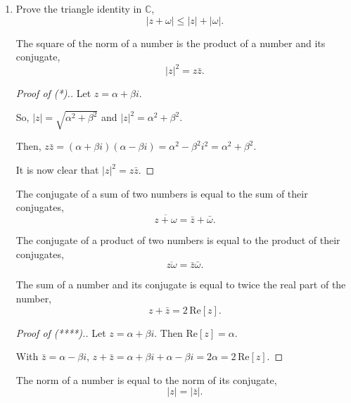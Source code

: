 \documentclass[../hw4]{subfiles}
\begin{document}
\begin{enumerate}[label= (\alph*)]
    \item Prove the triangle identity in $\mathbb{C}$, \[|z+\omega|\leq|z|+|\omega|.\]
    
    \begin{proposition}[*]
        The square of the norm of a number is the product of a number and its conjugate, \[{|z|}^2=z\bar{z}.\]
    \end{proposition}

    \begin{proof}[Proof of (*).]
        Let $z=\alpha + \beta i$.

        So, $|z|=\sqrt{\alpha^2+\beta^2}$ and ${|z|}^2=\alpha^2+\beta^2$.

        Then, $z\bar{z}=(\alpha+\beta i)(\alpha - \beta i)=\alpha^2-\beta^2 i^2 = \alpha^2 + \beta^2$.

        It is now clear that ${|z|}^2=z\bar{z}$.
    \end{proof}

    \begin{proposition}[**]
        The conjugate of a sum of two numbers is equal to the sum of their conjugates, \[\overline{z+\omega}=\bar{z}+\bar{\omega}.\]
    \end{proposition}

    \begin{proposition}[***]
        The conjugate of a product of two numbers is equal to the product of their conjugates, \[\overline{z\omega}=\bar{z}\bar{\omega}.\]
    \end{proposition}

    \begin{proposition}[****]
        The sum of a number and its conjugate is equal to twice the real part of the number, \[z+\bar{z}=2\,\text{Re}[z].\]
    \end{proposition}

    \begin{proof}[Proof of (****).]
        Let $z=\alpha+\beta i$. Then $\text{Re}[z]=\alpha$.
        
        With $\bar{z}=\alpha-\beta i$, $z+\bar{z}=\alpha+\beta i + \alpha - \beta i=2\alpha=2\,\text{Re}[z]$.
    \end{proof}

    \begin{proposition}[*****]
        The norm of a number is equal to the norm of its conjugate, \[|z|=|\bar{z}|.\]
    \end{proposition}


\end{enumerate}
\end{document}
